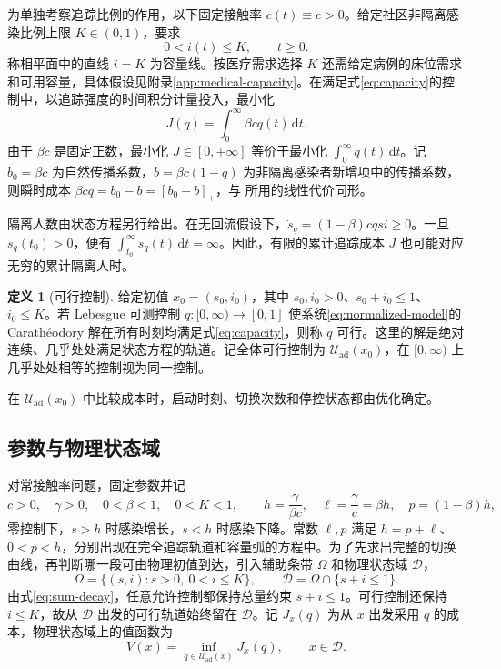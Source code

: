 \documentclass[lang=cn,a4paper,newtx]{elegantpaper}
\theoremstyle{plain}
\theoremstyle{definition}
\newtheorem{paperdefinition}[theorem]{定义}
\newcommand{\Dcal}{\mathcal D}
\newcommand{\Uad}{\mathcal U_{\mathrm{ad}}}
\newcommand{\dd}{\,\mathrm d}
\begin{document}
为单独考察追踪比例的作用，以下固定接触率 $c(t)\equiv c>0$。给定社区非隔离感染比例上限 $K\in(0,1)$，要求
\begin{equation}
 0<i(t)\le K,\qquad t\ge0.
 \label{eq:capacity}
\end{equation}
称相平面中的直线 $i=K$ 为容量线。按医疗需求选择 $K$ 还需给定病例的床位需求和可用容量，具体假设见附录\ref{app:medical-capacity}。在满足式\eqref{eq:capacity}的控制中，以追踪强度的时间积分计量投入，最小化
\begin{equation}
 J(q)=\int_0^\infty\beta cq(t)\dd t.
 \label{eq:linear-cost}
\end{equation}
由于 $\beta c$ 是固定正数，最小化 $J\in[0,+\infty]$ 等价于最小化 $\int_0^\infty q(t)\dd t$。记 $b_0=\beta c$ 为自然传播系数，$b=\beta c(1-q)$ 为非隔离感染者新增项中的传播系数，则瞬时成本 $\beta cq=b_0-b=[b_0-b]_+$，与 \textcite{MicloSpiroWeibull2022} 所用的线性代价同形。

隔离人数由状态方程另行给出。在无回流假设下，$\dot s_q=(1-\beta)cqsi\ge0$。一旦 $s_q(t_0)>0$，便有 $\int_{t_0}^{\infty}s_q(t)\dd t=\infty$。因此，有限的累计追踪成本 $J$ 也可能对应无穷的累计隔离人时。

\begin{paperdefinition}[可行控制]
\label{def:admissible}
给定初值 $x_0=(s_0,i_0)$，其中 $s_0,i_0>0$、$s_0+i_0\le1$、$i_0\le K$。若 Lebesgue 可测控制 $q:[0,\infty)\to[0,1]$ 使系统\eqref{eq:normalized-model}的 Carath\'eodory 解在所有时刻均满足式\eqref{eq:capacity}，则称 $q$ 可行。这里的解是绝对连续、几乎处处满足状态方程的轨道。记全体可行控制为 $\Uad(x_0)$，在 $[0,\infty)$ 上几乎处处相等的控制视为同一控制。
\end{paperdefinition}

在 $\Uad(x_0)$ 中比较成本时，启动时刻、切换次数和停控状态都由优化确定。

\subsection{参数与物理状态域}
对常接触率问题，固定参数并记
\begin{equation}
c>0,\quad\gamma>0,\quad0<\beta<1,\quad0<K<1,
\qquad h=\frac{\gamma}{\beta c},\quad\ell=\frac{\gamma}{c}=\beta h,\quad p=(1-\beta)h,
\label{eq:constants}
\end{equation}
零控制下，$s>h$ 时感染增长，$s<h$ 时感染下降。常数 $\ell,p$ 满足 $h=p+\ell$、$0<p<h$，分别出现在完全追踪轨道和容量弧的方程中。为了先求出完整的切换曲线，再判断哪一段可由物理初值到达，引入辅助条带 $\Omega$ 和物理状态域 $\Dcal$，
\[
\Omega=\{(s,i):s>0,\ 0<i\le K\},\qquad
\Dcal=\Omega\cap\{s+i\le1\}.
\]
由式\eqref{eq:sum-decay}，任意允许控制都保持总量约束 $s+i\le1$。可行控制还保持 $i\le K$，故从 $\Dcal$ 出发的可行轨道始终留在 $\Dcal$。记 $J_x(q)$ 为从 $x$ 出发采用 $q$ 的成本，物理状态域上的值函数为
\begin{equation}
V(x)=\inf_{q\in\Uad(x)}J_x(q),\qquad x\in\Dcal.
\label{eq:value-definition}
\end{equation}
\end{document}
